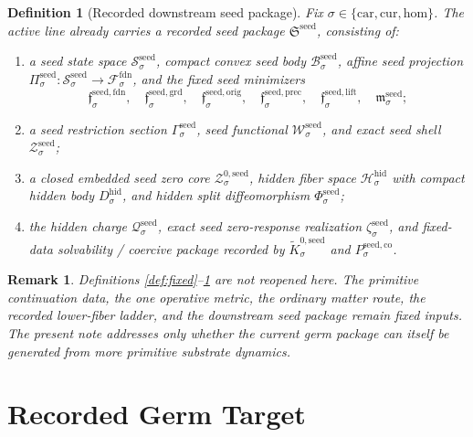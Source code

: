\documentclass[11pt]{article}
\newcommand{\Car}{\mathrm{car}}
\newcommand{\Cur}{\mathrm{cur}}
\newcommand{\Hom}{\mathrm{hom}}
\newcommand{\FoundSpace}[1]{\mathcal F_{#1}^{\mathrm{fdn}}}
\newcommand{\HiddenSpace}[1]{\mathcal H_{#1}^{\mathrm{hid}}}
\newcommand{\HiddenBody}[1]{D_{#1}^{\mathrm{hid}}}
\newcommand{\SeedPackage}{\mathfrak S^{\mathrm{seed}}}
\newcommand{\SeedSpace}[1]{\mathcal S_{#1}^{\mathrm{seed}}}
\newcommand{\SeedBody}[1]{\mathcal B_{#1}^{\mathrm{seed}}}
\newcommand{\SeedProj}[1]{\Pi_{#1}^{\mathrm{seed}}}
\newcommand{\SeedFoundMin}[1]{\mathfrak f_{#1}^{\mathrm{seed,fdn}}}
\newcommand{\SeedGroundMin}[1]{\mathfrak f_{#1}^{\mathrm{seed,grd}}}
\newcommand{\SeedOrigMin}[1]{\mathfrak f_{#1}^{\mathrm{seed,orig}}}
\newcommand{\SeedPrecMin}[1]{\mathfrak f_{#1}^{\mathrm{seed,prec}}}
\newcommand{\SeedLiftMin}[1]{\mathfrak f_{#1}^{\mathrm{seed,lift}}}
\newcommand{\SeedSubMin}[1]{\mathfrak m_{#1}^{\mathrm{seed}}}
\newcommand{\SeedSection}[1]{\Gamma_{#1}^{\mathrm{seed}}}
\newcommand{\SeedFunctional}[1]{\mathscr W_{#1}^{\mathrm{seed}}}
\newcommand{\SeedShellSet}[1]{\mathcal Z_{#1}^{\mathrm{seed}}}
\newcommand{\SeedZeroCore}[1]{\mathcal Z_{#1}^{0,\mathrm{seed}}}
\newcommand{\SeedSplit}[1]{\Phi_{#1}^{\mathrm{seed}}}
\newcommand{\SeedCharge}[1]{\mathcal Q_{#1}^{\mathrm{seed}}}
\newcommand{\SeedEmbed}[1]{\zeta_{#1}^{\mathrm{seed}}}
\newcommand{\SeedKernelCh}[1]{\widetilde K_{#1}^{0,\mathrm{seed}}}
\newcommand{\SeedStateComp}[1]{P_{#1}^{\mathrm{seed,co}}}
\newtheorem{definition}{Definition}
\newtheorem{remark}{Remark}
\begin{document}
\begin{definition}[Recorded downstream seed package]
\label{def:seed}
Fix \(\sigma\in\{\Car,\Cur,\Hom\}\). The active line already carries a recorded seed package \(\SeedPackage\), consisting of:
\begin{enumerate}
    \item a seed state space \(\SeedSpace{\sigma}\), compact convex seed body \(\SeedBody{\sigma}\), affine seed projection \(\SeedProj{\sigma}:\SeedSpace{\sigma}\to\FoundSpace{\sigma}\), and the fixed seed minimizers
    \[
    \SeedFoundMin{\sigma},\quad
    \SeedGroundMin{\sigma},\quad
    \SeedOrigMin{\sigma},\quad
    \SeedPrecMin{\sigma},\quad
    \SeedLiftMin{\sigma},\quad
    \SeedSubMin{\sigma};
    \]
    \item a seed restriction section \(\SeedSection{\sigma}\), seed functional \(\SeedFunctional{\sigma}\), and exact seed shell \(\SeedShellSet{\sigma}\);
    \item a closed embedded seed zero core \(\SeedZeroCore{\sigma}\), hidden fiber space \(\HiddenSpace{\sigma}\) with compact hidden body \(\HiddenBody{\sigma}\), and hidden split diffeomorphism \(\SeedSplit{\sigma}\);
    \item the hidden charge \(\SeedCharge{\sigma}\), exact seed zero-response realization \(\SeedEmbed{\sigma}\), and fixed-data solvability / coercive package recorded by \(\SeedKernelCh{\sigma}\) and \(\SeedStateComp{\sigma}\).
\end{enumerate}
\end{definition}

\begin{remark}
Definitions \ref{def:fixed}--\ref{def:seed} are not reopened here. The primitive continuation data, the one operative metric, the ordinary matter route, the recorded lower-fiber ladder, and the downstream seed package remain fixed inputs. The present note addresses only whether the current germ package can itself be generated from more primitive substrate dynamics.
\end{remark}

\section{Recorded Germ Target}
\end{document}
